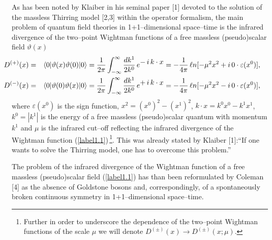 \documentclass[a4paper,12pt] {article}
\begin{document}
\hspace{0.2in} As has been noted by Klaiber in his seminal paper [1]
devoted to the solution of the massless Thirring model [2,3] within
the operator formalism, the main problem of quantum field theories in
1+1--dimensional space--time is the infrared divergence of the
two--point Wightman functions of a free massless (pseudo)scalar field
$\vartheta(x)$
%
\begin{eqnarray}\label{label1.1}
\hspace{-0.3in}D^{(+)}(x) &=& \langle
0|\vartheta(x)\vartheta(0)|0\rangle =
\frac{1}{2\pi}\int^{\infty}_{-\infty}\frac{dk^1}{2k^0}\,e^{\textstyle
-\,i\,k\cdot x} = - \frac{1}{4\pi}\,{\ell n}[-\mu^2x^2 +
i\,0\cdot\varepsilon(x^0)], \nonumber\\ \hspace{-0.3in}D^{(-)}(x) &=&
\langle 0|\vartheta(0)\vartheta(x)|0\rangle =
\frac{1}{2\pi}\int^{\infty}_{-\infty}\frac{dk^1}{2k^0}\,e^{\textstyle
+\,i\,k\cdot x} = - \frac{1}{4\pi}\,{\ell n}[-\mu^2x^2 -
i\,0\cdot\varepsilon(x^0)],
\end{eqnarray}
%
where $\varepsilon(x^0)$ is the sign function, $x^2 = (x^0)^2 -
(x^1)^2$, $k\cdot x = k^0x^0 - k^1x^1$, $k^0 = |k^1|$ is the energy of
a free massless (pseudo)scalar quantum with momentum $k^1$ and $\mu$
is the infrared cut--off reflecting the infrared divergence of the
Wightman function (\ref{label1.1})\,\footnote{Further in order to
underscore the dependence of the two--point Wightman functions of the
scale $\mu$ we will denote $D^{(\pm)}(x) \to D^{(\pm)}(x;
\mu)$.}. This was already stated by Klaiber [1]:``If one wants to
solve the Thirring model, one has to overcome this problem.''

The problem of the infrared divergence of the Wightman function of a
free massless (pseudo)scalar field (\ref{label1.1}) has than been
reformulated by Coleman [4] as the absence of Goldstone bosons and,
correspondingly, of a spontaneously broken continuous symmetry in
1+1--dimensional space--time.
\end{document}
